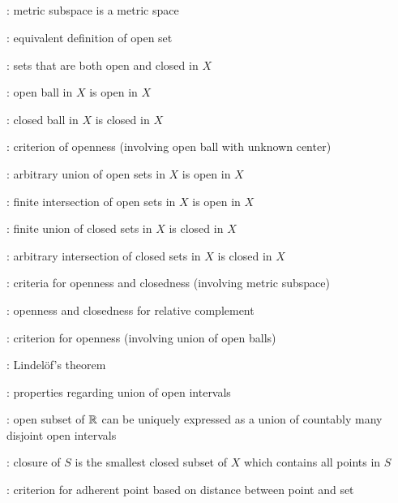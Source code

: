 \subsection*{}
\item {}: metric subspace is a metric space
\item {}: equivalent definition of open set
\item {}: sets that are both open and closed in \(X\)
\item {}: open ball in \(X\) is open in \(X\)
\item {}: closed ball in \(X\) is closed in \(X\)
\item {}: criterion of openness (involving open ball with unknown center)
\item {}: arbitrary union of open sets in \(X\) is open in \(X\)
\item {}: finite intersection of open sets in \(X\) is open in \(X\)
\item {}: finite union of closed sets in \(X\) is closed in \(X\)
\item {}: arbitrary intersection of closed sets in \(X\) is closed in \(X\)
\item {}: criteria for
openness and closedness (involving metric subspace)
\item {}: openness and closedness for relative complement
\item {}: criterion for openness (involving union of open balls)
\item {}: Lindel\"of's theorem
\item {}: properties regarding union of open intervals
\item {}: open subset of \(\mathbb{R}\) can be uniquely
expressed as a union of countably many disjoint open intervals
\item {}: closure of \(S\) is the smallest closed subset of \(X\) which contains all points in \(S\)
\item {}: criterion for adherent point based on distance between point and set
